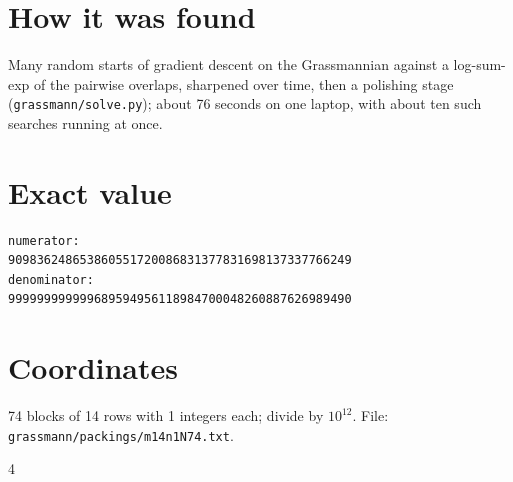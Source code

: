 \documentclass[11pt,a4paper]{article}
\begin{document}
\section{How it was found}
Many random starts of gradient descent on the Grassmannian against a log-sum-exp of the pairwise overlaps, sharpened over time, then a polishing stage (\texttt{grassmann/solve.py}); about 76 seconds on one laptop, with about ten such searches running at once.


\appendix
\section{Exact value}
{\small
\begin{verbatim}
numerator:
909836248653860551720086831377831698137337766249
denominator:
999999999999689594956118984700048260887626989490
\end{verbatim}}

\section{Coordinates}
74 blocks of 14 rows with 1 integers each; divide by $10^{12}$. File: \texttt{grassmann/packings/m14n1N74.txt}.
{\tiny
\begin{multicols}{4}
\end{multicols}}
\end{document}
